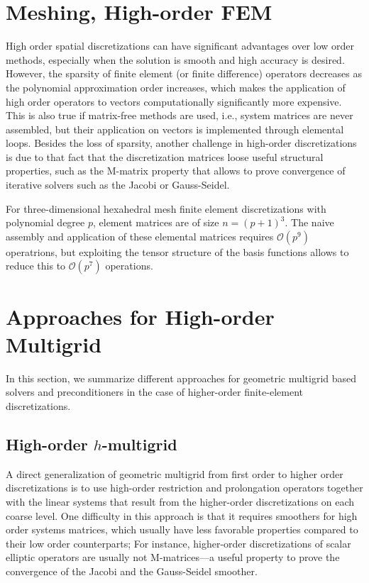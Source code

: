 \documentclass[times]{nlaauth}
\begin{document}
\section{Meshing, High-order FEM}


High order spatial discretizations can have significant advantages
over low order methods, especially when the solution is smooth and
high accuracy is desired. However, the sparsity of finite element (or
finite difference) operators decreases as the polynomial approximation
order increases, which makes the application of high order operators
to vectors computationally significantly more expensive. This is also
true if matrix-free methods are used, i.e., system matrices are never
assembled, but their application on vectors is implemented through
elemental loops.  Besides the loss of sparsity, another challenge in
high-order discretizations is due to that fact that the discretization
matrices loose useful structural properties, such as the M-matrix
property that allows to prove convergence of iterative solvers such as
the Jacobi or Gauss-Seidel.

For three-dimensional hexahedral mesh finite element discretizations
with polynomial degree $p$, element matrices are of size
$n=(p+1)^3$. The naive assembly and application of these elemental
matrices requires $\mathcal O(p^9)$ operatrions, but exploiting the
tensor structure of the basis functions allows to reduce this to
$\mathcal O(p^7)$ operations.




\section{Approaches for High-order Multigrid}


In this section, we summarize different approaches for geometric
multigrid based solvers and preconditioners in the case of
higher-order finite-element discretizations.

\subsection{High-order $h$-multigrid}
A direct generalization of geometric multigrid from first order to
higher order discretizations is to use high-order restriction and
prolongation operators together with the linear systems that result
from the higher-order discretizations on each coarse level.  One
difficulty in this approach is that it requires smoothers for high
order systems matrices, which usually have less favorable properties
compared to their low order counterparts; For instance, higher-order
discretizations of scalar elliptic operators are usually not
M-matrices---a useful property to prove the convergence of the Jacobi
and the Gauss-Seidel smoother.
\end{document}
